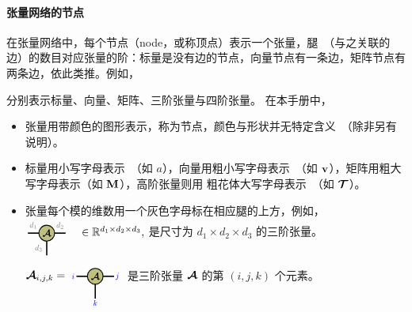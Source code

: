 \paragraph{张量网络的节点}\label{def:tn-nodes}
在张量网络中，每个节点（node，或称顶点）表示一个张量，腿~（与之关联的边）的数目对应张量的阶：标量是没有边的节点，向量节点有一条边，矩阵节点有两条边，依此类推。例如，
\begin{center}
    
\end{center}
分别表示标量、向量、矩阵、三阶张量与四阶张量。
在本手册中，
\begin{itemize}
    \item 张量用带颜色的图形表示，称为节点，颜色与形状并无特定含义~（除非另有说明）。
    \item 标量用小写字母表示~（如 $a$），向量用粗小写字母表示~（如 $\mathbf{v}$），矩阵用粗大写字母表示（如 $\mathbf{M}$），高阶张量则用
    粗花体大写字母表示~（如 $\bm{\mathcal{T}}$）。
    \item 张量每个模的维数用一个灰色字母标在相应腿的上方，例如，
$
    \begin{tikzpicture}[baseline=-0.5ex]
    \tikzset{tensor/.style = {minimum size = 0.5cm,shape = circle,thick,draw=black,inner sep = 0pt}, edge/.style = {thick,line width=.4mm},every loop/.style={}}
    \def\y{0}
    \def\x{0}
    \node[tensor,fill=green!50!red!50!white] (A) at (\x,\y){\scalebox{0.85}{$\At$}};
    \draw[edge] (\x+0.25,\y) -- (\x+0.6,\y)  node [midway,above] {\scalebox{0.7}{\dimcolor{$d_2$}}};
    \draw[edge] (\x-0.25,\y) -- (\x-0.6,\y)  node [midway,above] {\scalebox{0.7}{\dimcolor{$d_1$}}};
    \draw[edge] (\x,\y-0.25) -- (\x,\y-0.7)  node [midway,left] {\scalebox{0.7}{\dimcolor{$d_3$}}};
    \end{tikzpicture}
    \ \ \ \in \RR^{d_1\times d_2\times d_3},
$
是尺寸为 $d_1\times d_2\times d_3$ 的三阶张量。
    
$
\At_{i,j,k} = 
    \begin{tikzpicture}[baseline=-0.5ex]
    \tikzset{tensor/.style = {minimum size = 0.5cm,shape = circle,thick,draw=black,inner sep = 0pt}, edge/.style = {thick,line width=.4mm},every loop/.style={}}
    \def\y{0}
    \def\x{0}
    \node[tensor,fill=green!50!red!50!white] (A) at (\x,\y){\scalebox{0.85}{$\At$}};
    \draw[edge] (\x+0.25,\y) -- (\x+0.6,\y)  node [pos=1.3] {\scalebox{0.7}{\indcolor{$j$}}};
    \draw[edge] (\x-0.25,\y) -- (\x-0.6,\y)  node [pos=1.3] {\scalebox{0.7}{\indcolor{$i$}}};
    \draw[edge] (\x,\y-0.25) -- (\x,\y-0.7)  node [pos=1.3] {\scalebox{0.7}{\indcolor{$k$}}};
    \end{tikzpicture}
$    
是三阶张量 $\bm{\mathcal{A}}$ 的第 $(i,j,k)$ 个元素。
\end{itemize}

